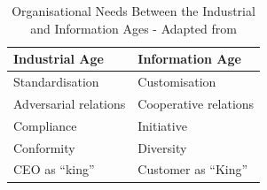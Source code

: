 \begin{table}[H]
\centering
\caption{Organisational Needs Between the Industrial and Information Ages - Adapted from \cite{Reigeluth1996}}
\begin{tabular}{@{}l|l@{}}
\toprule
\textbf{Industrial Age} & \textbf{Information Age} \\ \midrule
Standardisation         & Customisation            \\
Adversarial relations   & Cooperative relations    \\
Compliance              & Initiative               \\
Conformity              & Diversity                \\
CEO as “king”           & Customer as “King”       \\ \bottomrule
\end{tabular}
\label{tab1}
\end{table}

